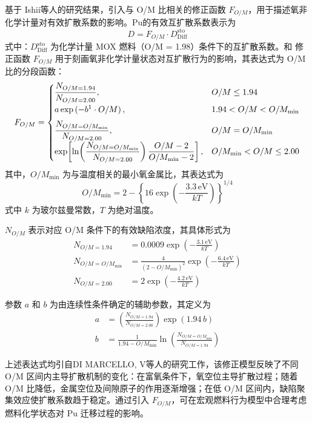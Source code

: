 基于 Ishii\cite{ishiiInvestigationPuMigration2001}等人的研究结果，引入与 O/M 比相关的修正函数 $F_{O/M}$，用于描述氧非化学计量对有效扩散系数的影响。Pu的有效互扩散系数表示为
\begin{equation}
	D = F_{O/M} \cdot D^{\mathrm{sto}}_{\mathrm{Diff}}
\end{equation}
式中：$D^{\mathrm{sto}}_{\mathrm{Diff}}$ 为化学计量 MOX 燃料（O/M = 1.98）条件下的互扩散系数。和
修正函数 $F_{O/M}$ 用于刻画氧非化学计量状态对互扩散行为的影响，其表达式为 O/M 比的分段函数：
\begin{equation}
	F_{O/M} =
	\begin{cases}
		\dfrac{N_{O/M=1.94}}{N_{O/M=2.00}}, & O/M \leq 1.94 \\[6pt]
		a \exp\left(-{b}\footnotemark\cdot{O/M}\right), & 1.94 < O/M < O/M_{\min} \\[6pt]
		\dfrac{N_{O/M=O/M_{\min}}}{N_{O/M=2.00}}, & O/M = O/M_{\min} \\[6pt]
		\exp\!\left[
		\ln\!\left(\dfrac{N_{O/M=O/M_{\min}}}{N_{O/M=2.00}}\right)
		\dfrac{O/M - 2}{O/M_{\min} - 2}
		\right], & O/M_{\min} < O/M \leq 2.00
	\end{cases}
\end{equation}
其中，$O/M_{\min}$ 为与温度相关的最小氧金属比，其表达式为
\begin{equation}
	O/M_{\min} = 2 - \left\{16 \exp\left(-\frac{3.3\,\text{eV}}{kT}\right)\right\}^{1/4}
\end{equation}
式中 $k$ 为玻尔兹曼常数，$T$ 为绝对温度。

$N_{O/M}$ 表示对应 O/M 条件下的有效缺陷浓度，其具体形式为
\begin{align}
	N_{O/M=1.94} &= 0.0009 \exp\left(-\frac{3.1\,\text{eV}}{kT}\right) \\
	N_{O/M=O/M_{\min}} &= \frac{4}{(2 - O/M_{\min})^{2}} \exp\left(-\frac{6.4\,\text{eV}}{kT}\right) \\
	N_{O/M=2.00} &= 2 \exp\left(-\frac{4.2\,\text{eV}}{kT}\right)
\end{align}

参数 $a$ 和 $b$ 为由连续性条件确定的辅助参数，其定义为
\begin{align}
	a &= \left(\frac{N_{O/M=1.94}}{N_{O/M=2.00}}\right)\exp(1.94\,b) \\
	b &= \frac{1}{1.94 - O/M_{\min}}
	\ln\left(\frac{N_{O/M=O/M_{\min}}}{N_{O/M=1.94}}\right)
\end{align}

上述表达式均引自DI MARCELLO, V\cite{dimarcelloImprovementsTRANSURANUSCode30,dimarcelloExtensionTRANSURANUSPlutonium2012}等人的研究工作，该修正模型反映了不同 O/M 区间内主导扩散机制的变化：在富氧条件下，氧空位主导扩散过程；随着 O/M 比降低，金属空位及间隙原子的作用逐渐增强；在低 O/M 区间内，缺陷聚集效应使扩散系数趋于稳定。通过引入 $F_{O/M}$，可在宏观燃料行为模型中合理考虑燃料化学状态对 Pu 迁移过程的影响。

